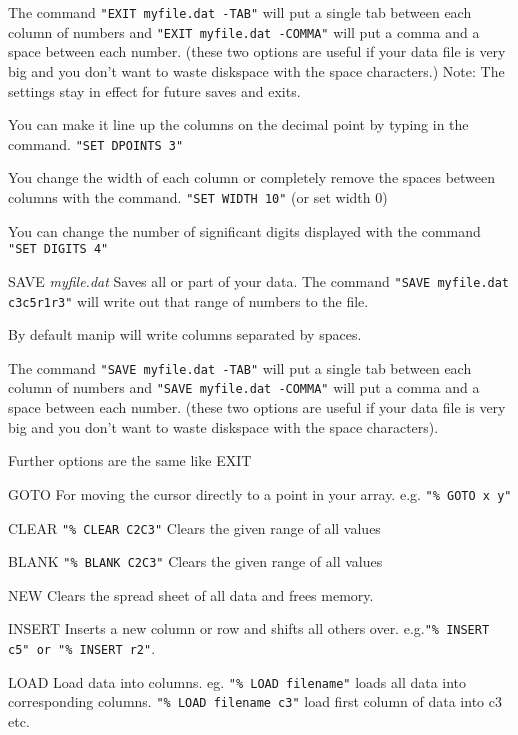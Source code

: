 \begin{commanddescription}
The command \verb#"EXIT myfile.dat -TAB"# will put a single tab between
each column of numbers and \verb#"EXIT myfile.dat -COMMA"# will put a
comma and a space between each number.  (these two options are
useful if your data file is very big and you don't want to waste
diskspace with the space characters.)  
Note: The settings stay in effect for future saves and exits.

You can make it line up the columns on the decimal point by typing in the
command. \verb#"SET DPOINTS 3"#

You change the width of each column or completely remove the spaces
between columns with the command. \verb#"SET WIDTH 10"#  (or set width 0)

You can change the number of significant digits displayed with
the command \verb#"SET DIGITS 4"#

\item[{\sf SAVE {\it myfile.dat}}]
Saves all or part of your data.
The command \verb#"SAVE myfile.dat c3c5r1r3"# will write out that range of
numbers to the file.

By default manip will write columns separated by spaces.

The command \verb#"SAVE myfile.dat -TAB"# will put a single tab between
each column of numbers and \verb#"SAVE myfile.dat -COMMA"# will put a
comma and a space between each number.  (these two options are
useful if your data file is very big and you don't want to waste
diskspace with the space characters).

Further options are the same like {\sf EXIT}  

\item[{\sf GOTO}]
For moving the cursor directly to a point in your array.
e.g. \verb#"% GOTO x y"#

\item[{\sf CLEAR}]
\verb#"% CLEAR C2C3"# Clears the given range of all values

\item[{\sf BLANK}]
\verb#"% BLANK C2C3"# Clears the given range of all values

\item[{\sf NEW}]
Clears the spread sheet of all data and frees memory.

\item[{\sf INSERT}]
Inserts a new column or row and shifts all others over.
e.g.\verb#"% INSERT c5" or "% INSERT r2"#.

\item[{\sf LOAD}]
Load data into columns. eg. \verb#"% LOAD filename"# loads all 
data into corresponding columns. \verb#"% LOAD filename c3"#
load first column of data into c3 etc.


\end{commanddescription}
